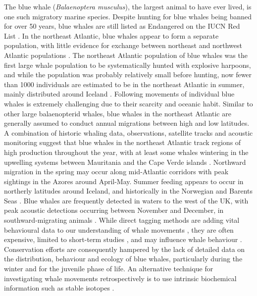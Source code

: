 \documentclass[a4paper,12pt]{article}
\begin{document}
The blue whale (\textit{Balaenoptera musculus}), the largest animal to have ever lived, is one such migratory marine species. 
Despite hunting for blue whales being banned for over 50 years, blue whales are still listed as Endangered on the IUCN Red List \cite{reilly2008balaenoptera}.
In the northeast Atlantic, blue whales appear to form a separate population, with little evidence for exchange between northeast and northwest Atlantic populations \cite{pike2009note}.  
The northeast Atlantic population of blue whales was the first large whale population to be systematically hunted with explosive harpoons, and while the population was probably relatively small before hunting, now fewer than 1000 individuals are estimated to be in the northeast Atlantic in summer, mainly distributed around Iceland \cite{pike2009note}.
Following movements of individual blue whales is extremely challenging due to their scarcity and oceanic habit.
Similar to other large balaenopterid whales, blue whales in the northeast Atlantic are generally assumed to conduct annual migrations between high and low latitudes. 
A combination of historic whaling data, observations, satellite tracks and acoustic monitoring suggest that blue whales in the northeast Atlantic track regions of high production throughout the year, with at least some whales wintering in the upwelling systems between Mauritania and the Cape Verde islands \cite{baines2014upwellings}.
Northward migration in the spring may occur along mid-Atlantic corridors with peak sightings in the Azores around April-May. Summer feeding appears to occur in northerly latitudes around Iceland, and historically in the Norwegian and Barents Seas \cite{pike2009note}.
Blue whales are frequently detected in waters to the west of the UK, with peak acoustic detections occurring between November and December, in southward-migrating animals \cite{reeves2004historical,baines2017autumn,charif2009acoustic,visser2011timing}.
While direct tagging methods are adding vital behavioural data to our understanding of whale movements \cite{borger15,mcdonald2006biogeographic,bailey2009behavioural,mate2007evolution,silva2013north}, they are often expensive, limited to short-term studies \cite{bailey2009behavioural,best2015tag,mate2007evolution}, and may influence whale behaviour \cite{walker2012review}.
Conservation efforts are consequently hampered by the lack of detailed data on the distribution, behaviour and ecology of blue whales, particularly during the winter and for the juvenile phase of life. 
An alternative technique for investigating whale movements retrospectively is to use intrinsic biochemical information such as stable isotopes \cite{west2006stable,busquets2017estimating,hobson2008tracking}. 
\end{document}
